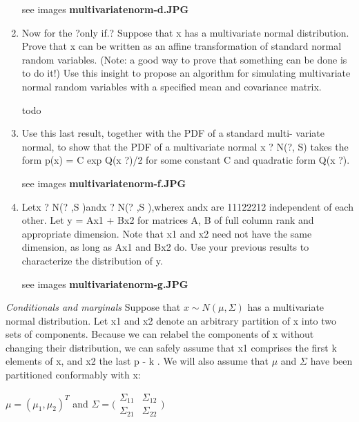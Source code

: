 \documentclass{homework}
\begin{document}
\begin{enumerate}[label=(\Alph*)]
\par * see images \textbf{multivariatenorm-d.JPG}

\item Now for the ?only if.? Suppose that x has a multivariate normal distribution. Prove that x can be written as an affine transformation of standard normal random variables. (Note: a good way to prove that something can be done is to do it!) Use this insight to propose an algorithm for simulating multivariate normal random variables with a specified mean and covariance matrix.

\par todo

\item Use this last result, together with the PDF of a standard multi- variate normal, to show that the PDF of a multivariate normal
x ? N(?, S) takes the form p(x) = C exp{ Q(x   ?)/2} for some constant C and quadratic form Q(x   ?).

\par * see images \textbf{multivariatenorm-f.JPG}

\item Letx ? N(? ,S )andx ? N(? ,S ),wherex andx are 11122212
independent of each other. Let y = Ax1 + Bx2 for matrices A, B of full column rank and appropriate dimension. Note that x1 and x2 need not have the same dimension, as long as Ax1 and Bx2 do. Use your previous results to characterize the distribution of y.

\par * see images \textbf{multivariatenorm-g.JPG}

\end{enumerate}

\textit{Conditionals and marginals}
Suppose that $x \sim N(\mu, \Sigma)$ has a multivariate normal distribution. Let x1 and x2 denote an arbitrary partition of x into two sets of components. Because we can relabel the components of x without changing their distribution, we can safely assume that x1 comprises the first k elements of x, and x2 the last p - k . We will also assume that $\mu$ and $\Sigma$ have been partitioned conformably with x:


$\mu = (\mu_1,\mu_2)^T$ and $\Sigma = \big( \begin{matrix} \Sigma_{11} & \Sigma_{12} \\ \Sigma_{21} & \Sigma_{22}\end{matrix} \big)$
\end{document}
